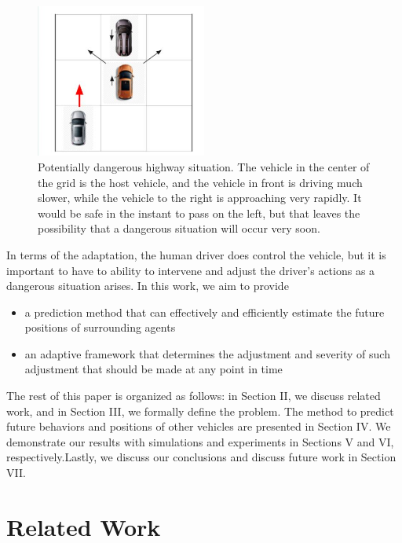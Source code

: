 \documentclass[conference]{IEEEtran}
\begin{document}
\begin{figure}[ht]
    \includegraphics[width=0.5\textwidth]{highwaysit.JPG}
    \caption{Potentially dangerous highway situation. The vehicle in the center of the grid is the host vehicle, and the vehicle in front is driving much slower, while the vehicle to the right is approaching very rapidly. It would be safe in the instant to pass on the left, but that leaves the possibility that a dangerous situation will occur very soon.}
    \label{fig:hiway}
\end{figure}
    
    In terms of the adaptation, the human driver does control the vehicle, but it is important to have to ability to intervene and adjust the driver's actions as a dangerous situation arises. In this work, we aim to provide
    \begin{itemize}
    \item{a prediction method that can effectively and efficiently estimate the future positions of surrounding agents}
    \item{an adaptive framework that determines the adjustment and severity of such adjustment that should be made at any point in time}
    \end{itemize}
    
    The rest of this paper is organized as follows: in Section II, we discuss related work, and in Section III, we formally define the problem. The method to predict future behaviors and positions of other vehicles are presented in Section IV. We demonstrate our results with simulations and experiments in Sections V and VI, respectively.Lastly, we discuss our conclusions and discuss future work in Section VII.

    

\section{Related Work}
\end{document}
